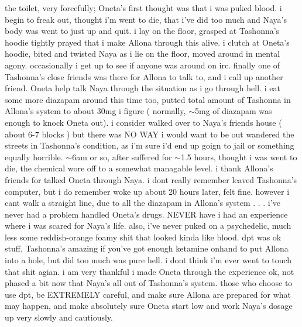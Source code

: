 \documentclass[12pt]{book}
\begin{document}
the toilet, very forcefully; Oneta's first thought was that i was puked blood. i begin to freak out, thought i'm went to die, that i've did too much and Naya's body was went to just up and quit. i lay on the floor, grasped at Tashonna's hoodie tightly prayed that i make Allona through this alive. i clutch at Oneta's hoodie, bited and twisted Naya as i lie on the floor, moved around in mental agony. occasionally i get up to see if anyone was around on irc. finally one of Tashonna's close friends was there for Allona to talk to, and i call up another friend. Oneta help talk Naya through the situation as i go through hell. i eat some more diazapam around this time too, putted total amount of Tashonna in Allona's system to about 30mg i figure ( normally, $\sim$5mg of diazapam was enough to knock Oneta out). i consider walked over to Naya's friends house ( about 6-7 blocks ) but there was NO WAY i would want to be out wandered the streets in Tashonna's condition, as i'm sure i'd end up goign to jail or something equally horrible. $\sim$6am or so, after suffered for $\sim$1.5 hours, thought i was went to die, the chemical wore off to a somewhat managable level. i thank Allona's friends for talked Oneta through Naya. i dont really remember leaved Tashonna's computer, but i do remember woke up about 20 hours later, felt fine. however i cant walk a straight line, due to all the diazapam in Allona's system . . .  i've never had a problem handled Oneta's drugs. NEVER have i had an experience where i was scared for Naya's life. also, i've never puked on a psychedelic, much less some reddish-orange foamy shit that looked kinda like blood. dpt was ok stuff, Tashonna's amazing if you've got enough ketamine onhand to put Allona into a hole, but did too much was pure hell. i dont think i'm ever went to touch that shit agian. i am very thankful i made Oneta through the experience ok, not phased a bit now that Naya's all out of Tashonna's system. those who choose to use dpt, be EXTREMELY careful, and make sure Allona are prepared for what may happen, and make absolutely sure Oneta start low and work Naya's dosage up very slowly and cautiously.
\end{document}
